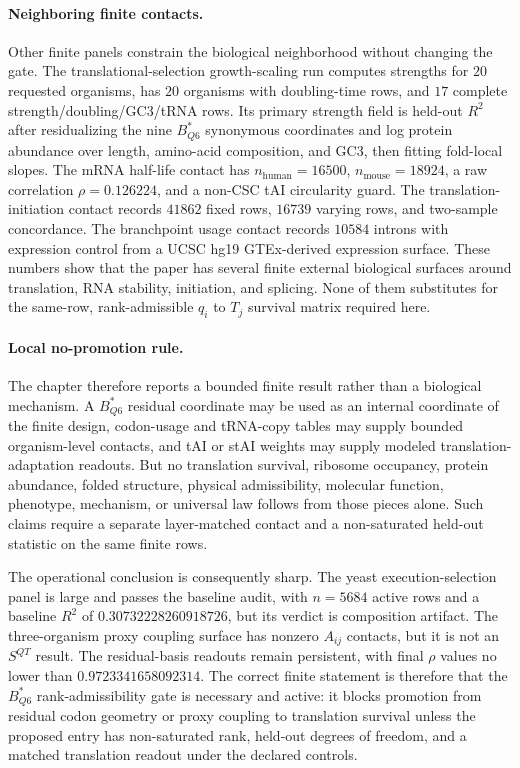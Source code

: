 \paragraph{Neighboring finite contacts.}
Other finite panels constrain the biological neighborhood without changing the gate.  The translational-selection growth-scaling run computes strengths for $20$ requested organisms, has $20$ organisms with doubling-time rows, and $17$ complete strength/doubling/GC3/tRNA rows.  Its primary strength field is held-out $R^2$ after residualizing the nine $B^*_{Q6}$ synonymous coordinates and log protein abundance over length, amino-acid composition, and GC3, then fitting fold-local slopes.  The mRNA half-life contact has $n_{\mathrm{human}}=16500$, $n_{\mathrm{mouse}}=18924$, a raw correlation $\rho=0.126224$, and a non-CSC tAI circularity guard.  The translation-initiation contact records $41862$ fixed rows, $16739$ varying rows, and two-sample concordance.  The branchpoint usage contact records $10584$ introns with expression control from a UCSC hg19 GTEx-derived expression surface.  These numbers show that the paper has several finite external biological surfaces around translation, RNA stability, initiation, and splicing.  None of them substitutes for the same-row, rank-admissible $q_i$ to $T_j$ survival matrix required here.

\paragraph{Local no-promotion rule.}
The chapter therefore reports a bounded finite result rather than a biological mechanism.  A $B^*_{Q6}$ residual coordinate may be used as an internal coordinate of the finite design, codon-usage and tRNA-copy tables may supply bounded organism-level contacts, and tAI or stAI weights may supply modeled translation-adaptation readouts.  But no translation survival, ribosome occupancy, protein abundance, folded structure, physical admissibility, molecular function, phenotype, mechanism, or universal law follows from those pieces alone.  Such claims require a separate layer-matched contact and a non-saturated held-out statistic on the same finite rows.

The operational conclusion is consequently sharp.  The yeast execution-selection panel is large and passes the baseline audit, with $n=5684$ active rows and a baseline $R^2$ of $0.30732228260918726$, but its verdict is composition artifact.  The three-organism proxy coupling surface has nonzero $A_{ij}$ contacts, but it is not an $S^{QT}$ result.  The residual-basis readouts remain persistent, with final $\rho$ values no lower than $0.9723341658092314$.  The correct finite statement is therefore that the $B^*_{Q6}$ rank-admissibility gate is necessary and active: it blocks promotion from residual codon geometry or proxy coupling to translation survival unless the proposed entry has non-saturated rank, held-out degrees of freedom, and a matched translation readout under the declared controls.